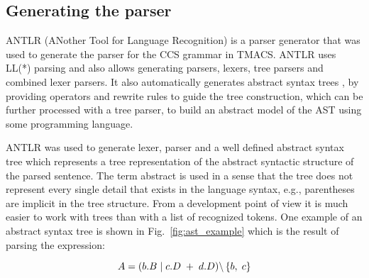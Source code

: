 \subsection{Generating the parser}
ANTLR (ANother Tool for Language Recognition) \cite{ANTLR} is a parser generator that was used 
to generate the parser for the CCS grammar in TMACS. ANTLR uses LL(*) parsing and also allows generating 
parsers, lexers, tree parsers and combined lexer parsers. It also automatically generates 
abstract syntax trees \cite{Compilers}, by providing operators and rewrite rules to guide the tree construction,
which can be further processed with a tree parser, to build an abstract model of the AST using some programming language.

ANTLR was used to generate lexer, parser and a well defined abstract syntax tree which represents a tree representation 
of the abstract syntactic structure of the parsed sentence. The term abstract is used in a sense 
that the tree does not represent every single detail that exists in the language syntax, 
e.g., parentheses are implicit in the tree structure. From a development point of view it is 
much easier to work with trees than with a list of recognized tokens. One example of an abstract syntax tree
is shown in Fig.~\ref{fig:ast_example} which is the result of parsing the expression: 

\begin{equation}\label{eq:ccs_example}
 A=( b.B \hspace{1 mm} | \hspace{1 mm} c.D \hspace{1 mm} + \hspace{1 mm} d.D )
\backslash \left\lbrace b, \hspace{1 mm} c \right\rbrace 
\end{equation}

